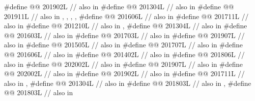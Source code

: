 \begin{codeblock}
#define @@             201902L // also in 
#define @@                  201304L // also in 
#define @@                            201911L
  // also in , , , , 
#define @@             201606L // also in 
#define @@                      201711L // also in 
#define @@                  201210L // also in , 
#define @@       201304L // also in 
#define @@                            201603L // also in 
#define @@                       201703L // also in 
#define @@                         201907L // also in 
#define @@                      201505L // also in 
#define @@                 201707L // also in 
#define @@              201606L // also in 
#define @@                201402L // also in 
#define @@                             201806L // also in 
#define @@           202002L // also in 
#define @@                   201907L // also in 
#define @@                              202002L // also in 
#define @@                             201902L // also in 
#define @@                  201711L // also in , 
#define @@                       201304L // also in 
#define @@                       201803L // also in , 
#define @@                           201803L // also in 

\end{codeblock}

